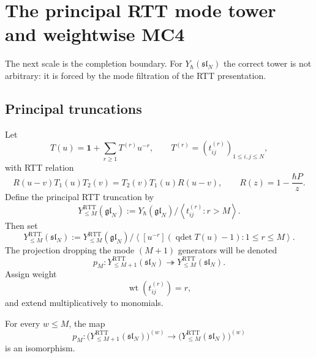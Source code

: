 \section{The principal RTT mode tower and weightwise MC4}
\label{sec:typeA-weightwise-mc4}

The next scale is the completion boundary. For
$Y_\hbar(\mathfrak{sl}_N)$ the correct tower is not arbitrary: it is
forced by the mode filtration of the RTT presentation.

\subsection{Principal truncations}

Let
\begin{equation}
T(u)=\mathbf 1+\sum_{r\ge 1}T^{(r)}u^{-r},
\qquad T^{(r)}=(t^{(r)}_{ij})_{1\le i,j\le N},
\end{equation}
with RTT relation
\begin{equation}
R(u-v)T_1(u)T_2(v)=T_2(v)T_1(u)R(u-v),
\qquad R(z)=1-\frac{\hbar P}{z}.
\end{equation}
Define the principal RTT truncation by
\begin{equation}
Y^{\mathrm{RTT}}_{\le M}(\mathfrak{gl}_N)
:=
Y_\hbar(\mathfrak{gl}_N)\Big/\left\langle t^{(r)}_{ij}:r>M\right\rangle.
\end{equation}
Then set
\begin{equation}
Y^{\mathrm{RTT}}_{\le M}(\mathfrak{sl}_N)
:=
Y^{\mathrm{RTT}}_{\le M}(\mathfrak{gl}_N)
\Big/
\left\langle [u^{-r}](\operatorname{qdet}T(u)-1):1\le r\le M\right\rangle.
\end{equation}
The projection dropping the mode $(M+1)$ generators will be denoted
\begin{equation}
p_M:Y^{\mathrm{RTT}}_{\le M+1}(\mathfrak{sl}_N)\twoheadrightarrow
Y^{\mathrm{RTT}}_{\le M}(\mathfrak{sl}_N).
\end{equation}
Assign weight
\begin{equation}
\operatorname{wt}(t^{(r)}_{ij})=r,
\end{equation}
and extend multiplicatively to monomials.

\begin{proposition}
\ClaimStatusProvedHere
\label{prop:weight-stability-algebra-tower}
For every $w\le M$, the map
\begin{equation}
\label{eq:weight-stability-algebra-map}
p_M:
\big(Y^{\mathrm{RTT}}_{\le M+1}(\mathfrak{sl}_N)\big)^{(w)}
\longrightarrow
\big(Y^{\mathrm{RTT}}_{\le M}(\mathfrak{sl}_N)\big)^{(w)}
\end{equation}
is an isomorphism.
\end{proposition}

